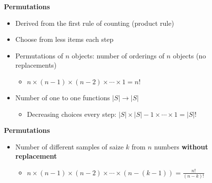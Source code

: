 \documentclass{article}\usepackage{amsmath,amssymb,amsthm,tikz,tkz-graph,color,chngpage,soul,hyperref,csquotes,graphicx,floatrow, listings}\newcommand*{\QEDB}{\hfill\ensuremath{\square}}\newtheorem*{prop}{Proposition}\renewcommand{\theenumi}{\alph{enumi}}\usepackage[shortlabels]{enumitem}\usepackage[nobreak=true]{mdframed}\usetikzlibrary{matrix,calc}\MakeOuterQuote{"}\usepackage[margin=0.75in]{geometry} \newtheorem{theorem}{Theorem}\newcommand{\Z}{\mathbb Z}\newcommand{\R}{\mathbb R}\newcommand{\Q}{\mathbb Q}\newcommand{\N}{\mathbb N}
\begin{document}
\textbf{Permutations}
\begin{itemize}
    \item Derived from the first rule of counting (product rule)
    \item Choose from less items each step
    \item Permutations of $n$ objects: number of orderings of $n$ objects (no replacements)
    \begin{itemize}
        \item $n \times (n-1) \times (n-2) \times\cdots \times 1 = n!$
    \end{itemize}
    \item Number of one to one functions $|S| \rightarrow |S|$ 
    \begin{itemize}
        \item Decreasing choices every step: $|S| \times |S|-1 \times \cdots \times 1 = |S|!$
    \end{itemize}
\end{itemize}
\begin{mdframed}
\textbf{Permutations}
\begin{itemize}
    \item Number of different samples of saize $k$ from $n$ numbers \textbf{without replacement}
    \begin{itemize}
        \item $n \times (n-1) \times (n-2) \times\cdots \times (n-(k-1)) = \frac{n!}{(n-k)!}$
    \end{itemize}
\end{itemize}
\end{mdframed}
\end{document}
